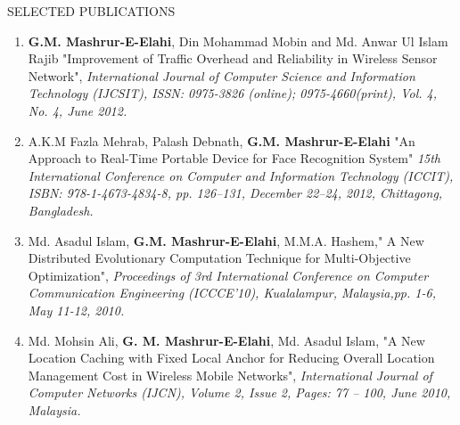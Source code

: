 \documentclass{resume} %
\begin{document}
\begin{rSection}{SELECTED PUBLICATIONS}
\begin{enumerate}
\item \textbf{G.M. Mashrur-E-Elahi}, Din Mohammad Mobin and Md. Anwar Ul Islam Rajib "Improvement of Traffic Overhead and Reliability in Wireless Sensor Network",\emph{ International Journal of Computer Science and Information Technology (IJCSIT), ISSN: 0975-3826 (online); 0975-4660(print), Vol. 4, No. 4, June 2012.}
\item A.K.M Fazla Mehrab, Palash Debnath, \textbf{G.M. Mashrur-E-Elahi} "An Approach to Real-Time Portable Device for Face Recognition System" \emph{15th International Conference on Computer and Information Technology (ICCIT), ISBN: 978-1-4673-4834-8, pp. 126–131, December 22–24, 2012, Chittagong, Bangladesh.}
\item Md. Asadul Islam, \textbf{G.M. Mashrur-E-Elahi}, M.M.A. Hashem," A New Distributed Evolutionary Computation Technique for Multi-Objective Optimization", \emph{Proceedings of 3rd International Conference on Computer Communication Engineering (ICCCE’10), Kualalampur, Malaysia,pp. 1-6, May 11-12, 2010.}
\item Md. Mohsin Ali,\textbf{ G. M. Mashrur-E-Elahi}, Md. Asadul Islam, "A New Location Caching with Fixed Local Anchor for Reducing Overall Location Management Cost in Wireless Mobile Networks", \emph{International Journal of Computer Networks (IJCN), Volume 2, Issue 2, Pages: 77 – 100, June 2010, Malaysia.}
\end{enumerate}

\end{rSection}







\end{document}
